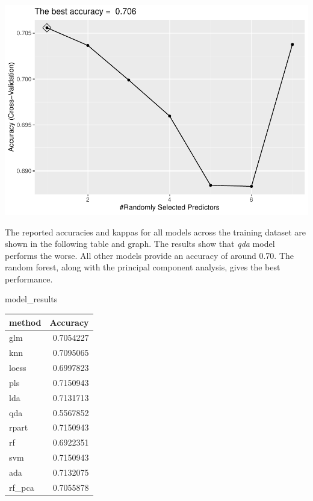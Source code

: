 \documentclass[]{article}
\newenvironment{Shaded}{\begin{snugshade}}{\end{snugshade}}
\newcommand{\CommentTok}[1]{\textcolor[rgb]{0.56,0.35,0.01}{\textit{#1}}}
\newcommand{\DataTypeTok}[1]{\textcolor[rgb]{0.13,0.29,0.53}{#1}}
\newcommand{\KeywordTok}[1]{\textcolor[rgb]{0.13,0.29,0.53}{\textbf{#1}}}
\newcommand{\NormalTok}[1]{#1}
\newcommand{\OperatorTok}[1]{\textcolor[rgb]{0.81,0.36,0.00}{\textbf{#1}}}
\newcommand{\StringTok}[1]{\textcolor[rgb]{0.31,0.60,0.02}{#1}}
\begin{document}
\includegraphics{LiverDisease_files/figure-latex/unnamed-chunk-35-1.pdf}

\begin{Shaded}
\end{Shaded}

The reported accuracies and kappas for all models across the training
dataset are shown in the following table and graph. The results show
that \emph{qda} model performs the worse. All other models provide an
accuracy of around 0.70. The random forest, along with the principal
component analysis, gives the best performance.

\begin{Shaded}
\begin{Highlighting}[]
\NormalTok{model_results}
\end{Highlighting}
\end{Shaded}

\begin{longtable}[]{@{}lr@{}}
\toprule
method & Accuracy\tabularnewline
\midrule
\endhead
glm & 0.7054227\tabularnewline
knn & 0.7095065\tabularnewline
loess & 0.6997823\tabularnewline
pls & 0.7150943\tabularnewline
lda & 0.7131713\tabularnewline
qda & 0.5567852\tabularnewline
rpart & 0.7150943\tabularnewline
rf & 0.6922351\tabularnewline
svm & 0.7150943\tabularnewline
ada & 0.7132075\tabularnewline
rf\_pca & 0.7055878\tabularnewline
\bottomrule
\end{longtable}
\end{document}
